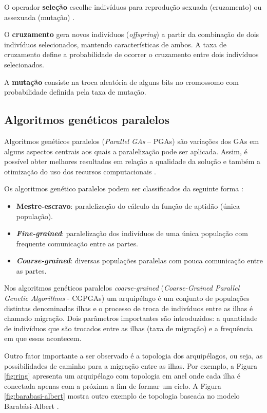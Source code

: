 O operador \textbf{seleção} escolhe indivíduos para reprodução sexuada (cruzamento) ou assexuada (mutação) \cite{erik2012geneticos}.

O \textbf{cruzamento} gera novos indivíduos (\textit{offspring}) a partir da combinação de dois indivíduos selecionados, mantendo características de ambos. A taxa de cruzamento define a probabilidade de ocorrer o cruzamento entre dois indivíduos selecionados.

A \textbf{mutação} consiste na troca aleatória de alguns bits no cromossomo com probabilidade definida pela taxa de mutação.

\subsection{Algoritmos genéticos paralelos}

Algoritmos genéticos paralelos (\textit{Parallel GAs} -- PGAs) \cite{shonkwiler1993parallel} são variações dos GAs em alguns aspectos centrais aos quais a paralelização pode ser aplicada. Assim, é possível obter melhores resultados em relação a qualidade da solução e também a otimização do uso dos recursos computacionais \cite{erik2012geneticos}.

Os algoritmos genético paralelos podem ser classificados da seguinte forma \cite{cantupaz1998asurvey}:

\begin{itemize}
    \item \textbf{Mestre-escravo}: paralelização do cálculo da função de aptidão (única população).
    \item \textbf{\textit{Fine-grained}}: paralelização dos indivíduos de uma única população com frequente comunicação entre as partes.
    \item \textbf{\textit{Coarse-grained}}: diversas populações paralelas com pouca comunicação entre as partes.
\end{itemize}

Nos algoritmos genéticos paralelos \textit{coarse-grained} (\textit{Coarse-Grained Parallel Genetic Algorithms} - CGPGAs) um arquipélago é um conjunto de populações distintas denominadas ilhas e o processo de troca de indivíduos entre as ilhas é chamado migração. Dois parâmetros importantes são introduzidos: a quantidade de indivíduos que são trocados entre as ilhas (taxa de migração) e a frequência em que essas acontecem.

Outro fator importante a ser observado é a topologia dos arquipélagos, ou seja, as possibilidades de caminho para a migração entre as ilhas. Por exemplo, a Figura \ref{fig:ring} apresenta um arquipélago com topologia em anel onde cada ilha é conectada apenas com a próxima a fim de formar um ciclo. A Figura \ref{fig:barabasi-albert} mostra outro exemplo de topologia baseada no modelo Barabási-Albert \cite{albert2002statistical}.

